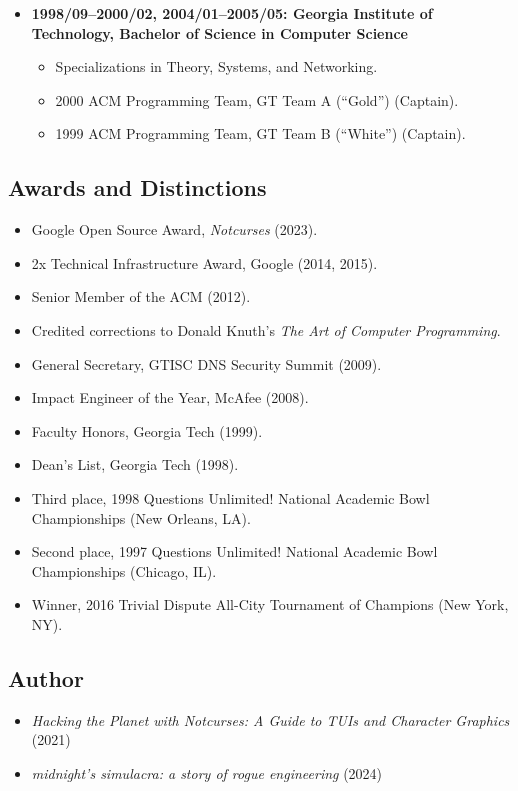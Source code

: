 \documentclass{article}
\newenvironment{tightitemize}
{\begin{itemize}
  \setlength{\itemsep}{1pt}
  \setlength{\parskip}{0pt}
  \setlength{\parsep}{0pt}}
{\end{itemize}}
\begin{document}
\begin{tightitemize}
\item \textbf{1998/09--2000/02, 2004/01--2005/05: Georgia Institute of Technology,
Bachelor of Science in Computer Science}
\begin{tightitemize}
\item Specializations in Theory, Systems, and Networking.
\item 2000 ACM Programming Team, GT Team A (``Gold'') (Captain).
\item 1999 ACM Programming Team, GT Team B (``White'') (Captain).
\end{tightitemize}
\end{tightitemize}

\vspace{2mm}
\subsection*{Awards and Distinctions}
\begin{tightitemize}
\item Google Open Source Award, \textit{Notcurses} (2023).
\item 2x Technical Infrastructure Award, Google (2014, 2015).
\item Senior Member of the ACM (2012).
\item Credited corrections to Donald Knuth's \textit{The Art of Computer Programming}.
\item General Secretary, GTISC DNS Security Summit (2009).
\item Impact Engineer of the Year, McAfee (2008).
\item Faculty Honors, Georgia Tech (1999).
\item Dean's List, Georgia Tech (1998).
\item Third place, 1998 Questions Unlimited! National Academic Bowl Championships (New Orleans, LA).
\item Second place, 1997 Questions Unlimited! National Academic Bowl Championships (Chicago, IL).
\item Winner, 2016 Trivial Dispute All-City Tournament of Champions (New York, NY).
\end{tightitemize}

\vspace{2mm}
\subsection*{Author}
\begin{tightitemize}
\item \textit{Hacking the Planet with Notcurses: A Guide to TUIs and Character Graphics} (2021)
\item \textit{midnight's simulacra: a story of rogue engineering} (2024)
\end{tightitemize}
\end{document}
